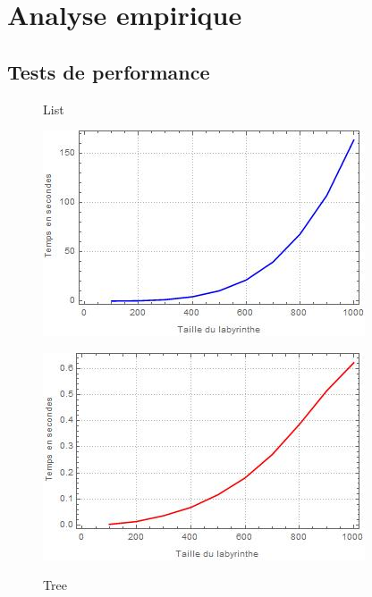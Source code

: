 \documentclass[10pt]{article}
\begin{document}
\section{Analyse empirique}
\subsection{Tests de performance}
\begin{figure}[ht]
  \centering
  \begin{minipage}[h]{0.4\textwidth}
  \caption{List}
    \includegraphics[width=\textwidth]{List_graph.jpg}
  \label{list}  
  \end{minipage}
  \hfill
  \begin{minipage}[h]{0.4\textwidth}
  \caption{Tree}
    \includegraphics[width=\textwidth]{Tree_graph.jpg}
  \label{tree}
  \end{minipage}
  \begin{minipage}[h]{0.4\textwidth} 

\end{minipage}
\end{figure}
\end{document}
